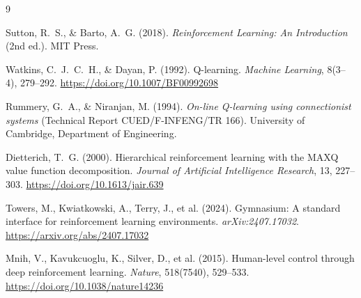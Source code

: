 \documentclass[11pt,a4paper]{article}
\begin{document}
\begin{thebibliography}{9}

Sutton, R.~S., \& Barto, A.~G. (2018).
\emph{Reinforcement Learning: An Introduction} (2nd ed.).
MIT Press.

Watkins, C.~J.~C.~H., \& Dayan, P. (1992).
Q-learning.
\emph{Machine Learning}, 8(3--4), 279--292.
\url{https://doi.org/10.1007/BF00992698}

Rummery, G.~A., \& Niranjan, M. (1994).
\emph{On-line Q-learning using connectionist systems}
(Technical Report CUED/F-INFENG/TR 166).
University of Cambridge, Department of Engineering.

Dietterich, T.~G. (2000).
Hierarchical reinforcement learning with the MAXQ value function decomposition.
\emph{Journal of Artificial Intelligence Research}, 13, 227--303.
\url{https://doi.org/10.1613/jair.639}

Towers, M., Kwiatkowski, A., Terry, J., et al. (2024).
Gymnasium: A standard interface for reinforcement learning environments.
\emph{arXiv:2407.17032}.
\url{https://arxiv.org/abs/2407.17032}

Mnih, V., Kavukcuoglu, K., Silver, D., et al. (2015).
Human-level control through deep reinforcement learning.
\emph{Nature}, 518(7540), 529--533.
\url{https://doi.org/10.1038/nature14236}

\end{thebibliography}
\end{document}

